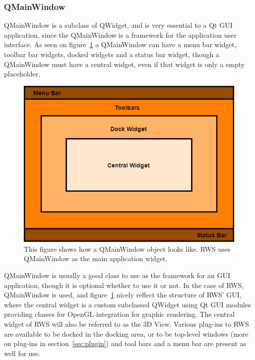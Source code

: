 \subsubsection{QMainWindow}
QMainWindow is a subclass of QWidget, and is very essential to a Qt GUI application, since the QMainWindow is a framework for the application user interface. As seen on figure~\ref{fig:QMainWindowExample} a QMainWindow can have a menu bar widget, toolbar bar widgets, docked widgets and a status bar widget, though a QMainWindow must have a central widget, even if that widget is only a empty placeholder. 

\begin{figure}[h]
	\centering
	\includegraphics[scale=0.55]{Figures/QMainWindowExample.png}
	\caption{This figure shows how a QMainWindow object looks like. RWS uses QMainWindow as the main application widget.}
	\label{fig:QMainWindowExample}
\end{figure}

QMainWindow is usually a good class to use as the framework for an GUI application, though it is optional whether to use it or not. In the case of RWS, QMainWindow is used, and figure~\ref{fig:QMainWindowExample} nicely reflect the structure of RWS' GUI, where the central widget is a custom subclassed QWidget using Qt GUI modules providing classes for OpenGL integration for graphic rendering. The central widget of RWS will also be referred to as the 3D View. Various plug-ins to RWS are available to be docked in the docking area, or to be top-level windows (more on plug-ins in section~\ref{sec:plugin}) and tool bars and a menu bar are present as well for use.

